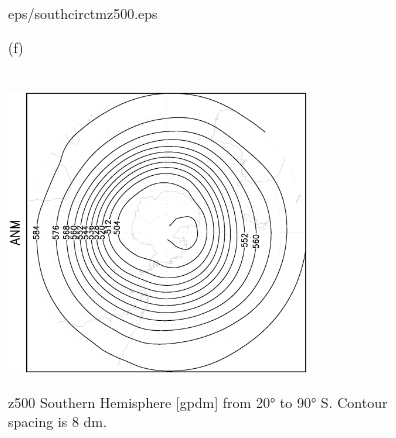 \documentclass[12pt,a4paper,twoside,openright,headinclude,liststotoc,bibtotoc]{scrreprt}
\begin{document}
\begin{appendix}
\begin{figure}[c]
{{eps/southcirctmz500.eps}
}
\parbox{8.5cm}{\hspace{0.80cm} \begin{scriptsize}(f) \end{scriptsize} \vspace{-0.5cm} \\
\includegraphics[height=7.5cm,angle=-90]
{eps/southcirct21tmz500.eps}
}
\caption[z500 Southern Hemisphere]{z500 Southern Hemisphere [gpdm] from 20° to 90° S. Contour spacing is 8 dm.}
\label{img:z500south}
\end{figure}




\end{appendix}
\end{document}
